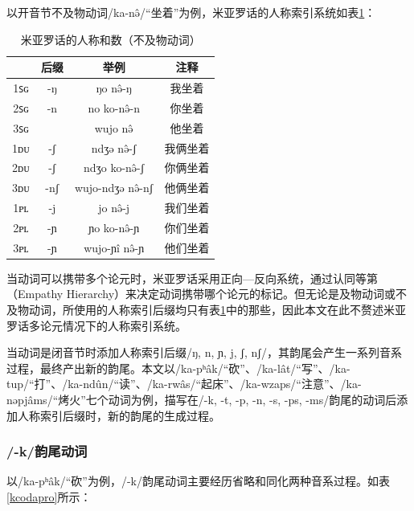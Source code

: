 以开音节不及物动词/ka-nə̂/“坐着”为例，米亚罗话的人称索引系统如表\ref{perindex}：

\begin{table}[H]
\vspace{5pt}
    \centering
    \caption{米亚罗话的人称和数（不及物动词）}
    \label{perindex}
\begin{tabular}{c|ccc}
\toprule
    & 后缀  & 举例               & 注释   \\
\midrule
1ꜱɢ & -ŋ  & ŋo nə̂-ŋ         & 我坐着  \\
2ꜱɢ & -n  & no ko-nə̂-n      & 你坐着  \\
3ꜱɢ &     & wujo nə̂         & 他坐着  \\
1ᴅᴜ & -ʃ  & ndʒə nə̂-ʃ       & 我俩坐着 \\
2ᴅᴜ & -ʃ  & ndʒo ko-nə̂-ʃ    & 你俩坐着 \\
3ᴅᴜ & -nʃ & wujo-ndʒə nə̂-nʃ & 他俩坐着 \\
1ᴘʟ & -j  & jo nə̂-j         & 我们坐着 \\
2ᴘʟ & -ɲ  & ɲo ko-nə̂-ɲ      & 你们坐着 \\
3ᴘʟ & -ɲ  & wujo-ɲî nə̂-ɲ   & 他们坐着\\
\bottomrule
\end{tabular}
\end{table}

当动词可以携带多个论元时，米亚罗话采用正向—反向系统，通过认同等第（Empathy Hierarchy）来决定动词携带哪个论元的标记\cite{DeLancey1981-pq,Zuniga2002-yv,Jacques2014-pu}。但无论是及物动词或不及物动词，所使用的人称索引后缀均只有表\ref{perindex}中的那些，因此本文在此不赘述米亚罗话多论元情况下的人称索引系统。

当动词是闭音节时添加人称索引后缀/ŋ, n, ɲ, j, ʃ, nʃ/，其韵尾会产生一系列音系过程，最终产出新的韵尾。本文以/ka-pʰâk/“砍”、/ka-lât/“写”、/ka-tup/“打”、/ka-ndûn/“读”、/ka-rwâs/“起床”、/ka-wzaps/“注意”、/ka-nəpjâms/“烤火”七个动词为例，描写在/-k, -t, -p, -n, -s, -ps, -ms/韵尾的动词后添加人称索引后缀时，新的韵尾的生成过程。

\subsubsection{/-k/韵尾动词}

以/ka-pʰâk/“砍”为例，/-k/韵尾动词主要经历省略和同化两种音系过程。如表\ref{kcodapro}所示：

